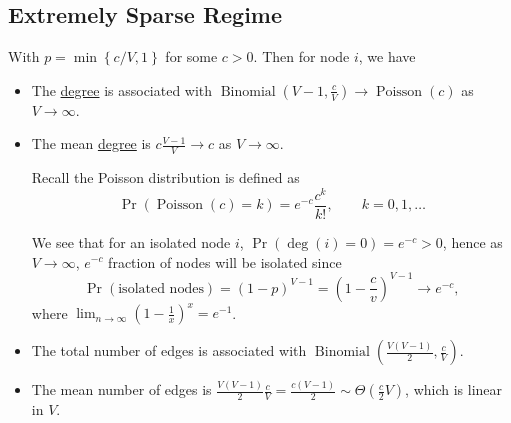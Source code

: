 \subsection{Extremely Sparse Regime}\label{subsec:extremely-sparse-regime}
With \(p = \min\left\{c / V, 1\right\}\) for some \(c>0\). Then for node \(i\), we have
\begin{itemize}
	\item The \hyperref[def:degree]{degree} is associated with \(\operatorname{Binomial}(V - 1, \frac{c}{V}) \to \operatorname{Poisson}(c) \) as \(V\to \infty \).
	\item The mean \hyperref[def:degree]{degree} is \(c \frac{V-1}{V}\to c\) as \(V\to \infty.\)
	      \begin{note}
		      Recall the Poisson distribution is defined as
		      \[
			      \Pr( \operatorname{Poisson}(c)=k ) = e^{-c} \frac{c^k}{k!}, \qquad k = 0, 1, \dots
		      \]
	      \end{note}
	      We see that for an isolated node \(i\), \(\Pr( \deg(i) =0) = e^{-c} > 0\), hence as \(V\to \infty \), \(e^{-c}\) fraction of nodes will be isolated since
	      \[
		      \Pr( \text{isolated nodes}) = (1 - p)^{V - 1} = \left(1 - \frac{c}{v}\right)^{V-1} \to e^{-c},
	      \]
	      where \(\lim_{n \to \infty} \left(1 - \frac{1}{x}\right)^x = e^{-1}\).
	\item The total number of edges is associated with \(\operatorname{Binomial}\left(\frac{V(V-1)}{2}, \frac{c}{V}\right)\).
	\item The mean number of edges is \(\frac{V(V - 1)}{2}\frac{c}{V} = \frac{c(V - 1)}{2}\sim \Theta(\frac{c}{2}V)\), which is linear in \(V\).
\end{itemize}

